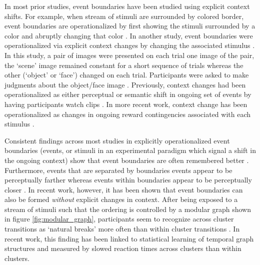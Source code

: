 In most prior studies, event boundaries have been studied using explicit context shifts. For example, when stream of stimuli are surrounded by colored border, event boundaries are operationalized by first showing the stimuli surrounded by a color and abruptly changing that color \parencite{heusser2018perceptual}. In another study, event boundaries were operationalized via explicit context changes by changing the associated stimulus \parencite{ezzyat2014similarity}. In this study, a pair of images were presented on each trial one image of the pair, the `scene' image remained constant for a short sequence of trials whereas the other (`object' or `face') changed on each trial. Participants were asked to make judgments about the object/face image \cite{ezzyat2014similarity}. Previously, context changes had been operationalized as either perceptual or semantic shift in ongoing set of events by having participants watch clips \cite{swallow2009event}. In more recent work, context change has been operationalized as changes in ongoing reward contingencies associated with each stimulus \cite{rouhani2020reward}. 

Consistent findings across most studies in explicitly operationalized event boundaries \ac{(events, or stimuli in an experimental paradigm which signal a shift in the ongoing context)} show that event boundaries are often remembered better \cite{swallow2009event, radvansky2017event, heusser2018perceptual,clewett2019transcending, rouhani2020reward,ezzyat2014similarity,baldassano2017discovering}. \ac{Furthermore, events that are separated by  boundaries events} appear to be perceptually farther whereas events within boundaries appear to be perceptually closer \cite{clewett2019transcending,ezzyat2014similarity,brunec2018boundaries,lositsky2016neural}. In recent work, however, it has been shown that event boundaries can also be formed \textit{without} explicit changes in context. After being exposed to a stream of stimuli such that the ordering is controlled by a modular graph shown in figure \ref{fig:modular_graph}, participants seem to recognize across cluster transitions as `natural breaks' more often than within cluster transitions \cite{schapiro2013neural}. In recent work, this finding has been linked to statistical learning of temporal graph structures \cite{karuza2022value,karuza2019human,kahn2018network,kahn2018network,lynn2020abstract,lynn2020human,lynn2020humans} and measured by slowed reaction times across clusters than within clusters. 

